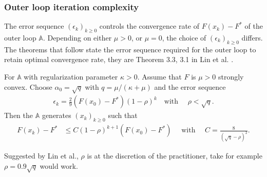 \documentclass[12pt]{article}
\begin{document}
        \subsubsection{Outer loop iteration complexity}
            The error sequence $(\epsilon_k)_{k \ge 0}$ controls the convergence rate of $F(x_k) - F^*$ of the outer loop $\mathbb A$. 
            Depending on either $\mu > 0$, or $\mu = 0$, the choice of $(\epsilon_k)_{k\ge 0}$ differs. 
            The theorems that follow state the error sequence required for the outer loop to retain optimal convergence rate, they are Theorem 3.3, 3.1 in Lin et al. \cite{lin_universal_2015}. 
            \begin{theorem}\label{thm:err-seq-outer-s-cnvx}
                For $\mathbb A$ with regularization parameter $\kappa > 0$. 
                Assume that $F$ is $\mu > 0$ strongly convex. 
                Choose $\alpha_0 = \sqrt{q}$ with $q = \mu/(\kappa + \mu)$ and the error sequence 
                $$
                \begin{aligned}
                    \epsilon_k = \frac{2}{9}(F(x_0) - F^*)(1 - \rho)^k \quad \text{with }\quad 
                    \rho < \sqrt{q}. 
                \end{aligned}
                $$
                Then the $\mathbb A$ generates $(x_{k})_{k \ge 0}$ such that 
                $$
                \begin{aligned}
                    F(x_k) - F^* &\le 
                    C(1 - \rho)^{k + 1} (F(x_0) - F^*) \quad \text{ with }\quad 
                    C = \frac{8}{(\sqrt{q} - \rho)^2}. 
                \end{aligned}
                $$
            \end{theorem}
            \begin{remark}
                Suggested by Lin et al., $\rho$ is at the discretion of the practitioner, take for example $\rho = 0.9\sqrt{q}$ would work. 
            \end{remark}
\end{document}
